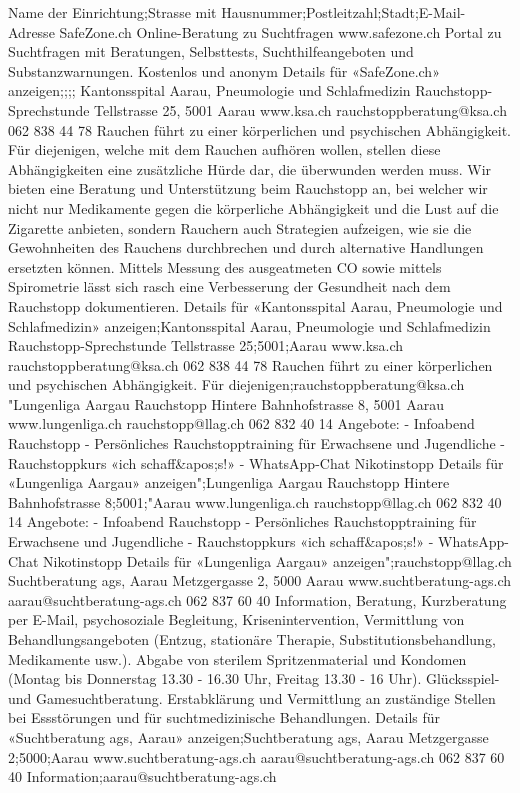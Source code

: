 ﻿Name der Einrichtung;Strasse mit Hausnummer;Postleitzahl;Stadt;E-Mail-Adresse
SafeZone.ch Online-Beratung zu Suchtfragen www.safezone.ch Portal zu Suchtfragen mit Beratungen, Selbsttests, Suchthilfeangeboten und Substanzwarnungen. Kostenlos und anonym Details für «SafeZone.ch» anzeigen;;;;
Kantonsspital Aarau, Pneumologie und Schlafmedizin Rauchstopp-Sprechstunde Tellstrasse 25, 5001 Aarau www.ksa.ch rauchstoppberatung@ksa.ch 062 838 44 78 Rauchen führt zu einer körperlichen und psychischen Abhängigkeit. Für diejenigen, welche mit dem Rauchen aufhören wollen, stellen diese Abhängigkeiten eine zusätzliche Hürde dar, die überwunden werden muss. Wir bieten eine Beratung und Unterstützung beim Rauchstopp an, bei welcher wir nicht nur Medikamente gegen die körperliche Abhängigkeit und die Lust auf die Zigarette anbieten, sondern Rauchern auch Strategien aufzeigen, wie sie die Gewohnheiten des Rauchens durchbrechen und durch alternative Handlungen ersetzten können. Mittels Messung des ausgeatmeten CO sowie mittels Spirometrie lässt sich rasch eine Verbesserung der Gesundheit nach dem Rauchstopp dokumentieren. Details für «Kantonsspital Aarau, Pneumologie und Schlafmedizin» anzeigen;Kantonsspital Aarau, Pneumologie und Schlafmedizin Rauchstopp-Sprechstunde Tellstrasse 25;5001;Aarau www.ksa.ch rauchstoppberatung@ksa.ch 062 838 44 78 Rauchen führt zu einer körperlichen und psychischen Abhängigkeit. Für diejenigen;rauchstoppberatung@ksa.ch
"Lungenliga Aargau Rauchstopp Hintere Bahnhofstrasse 8, 5001 Aarau www.lungenliga.ch rauchstopp@llag.ch 062 832 40 14 Angebote: - Infoabend Rauchstopp - Persönliches Rauchstopptraining für Erwachsene und Jugendliche - Rauchstoppkurs «ich schaff&apos;s!» - WhatsApp-Chat Nikotinstopp Details für «Lungenliga Aargau» anzeigen";Lungenliga Aargau Rauchstopp Hintere Bahnhofstrasse 8;5001;"Aarau www.lungenliga.ch rauchstopp@llag.ch 062 832 40 14 Angebote: - Infoabend Rauchstopp - Persönliches Rauchstopptraining für Erwachsene und Jugendliche - Rauchstoppkurs «ich schaff&apos;s!» - WhatsApp-Chat Nikotinstopp Details für «Lungenliga Aargau» anzeigen";rauchstopp@llag.ch
Suchtberatung ags, Aarau Metzgergasse 2, 5000 Aarau www.suchtberatung-ags.ch aarau@suchtberatung-ags.ch 062 837 60 40 Information, Beratung, Kurzberatung per E-Mail, psychosoziale Begleitung, Krisenintervention, Vermittlung von Behandlungsangeboten (Entzug, stationäre Therapie, Substitutionsbehandlung, Medikamente usw.). Abgabe von sterilem Spritzenmaterial und Kondomen (Montag bis Donnerstag 13.30 - 16.30 Uhr, Freitag 13.30 - 16 Uhr). Glücksspiel- und Gamesuchtberatung. Erstabklärung und Vermittlung an zuständige Stellen bei Essstörungen und für suchtmedizinische Behandlungen. Details für «Suchtberatung ags, Aarau» anzeigen;Suchtberatung ags, Aarau Metzgergasse 2;5000;Aarau www.suchtberatung-ags.ch aarau@suchtberatung-ags.ch 062 837 60 40 Information;aarau@suchtberatung-ags.ch
